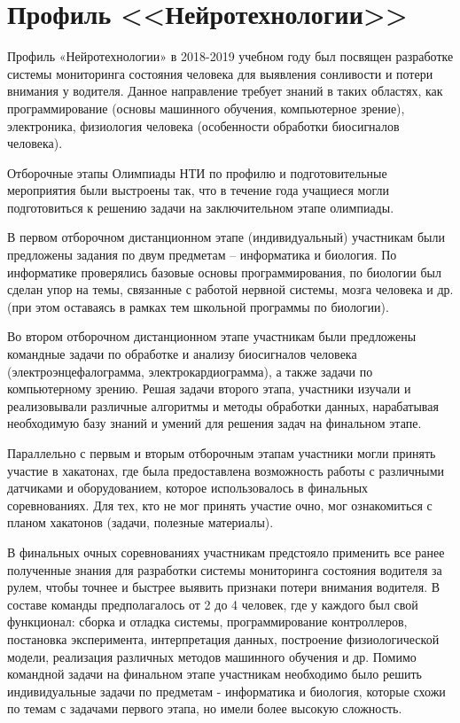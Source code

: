 

\chapter{Профиль <<Нейротехнологии>>}

Профиль «Нейротехнологии» в 2018-2019 учебном году был посвящен разработке системы мониторинга состояния человека для выявления сонливости и потери внимания у водителя. Данное направление требует знаний в таких областях, как программирование (основы машинного обучения, компьютерное зрение), электроника, физиология человека (особенности обработки биосигналов человека).

Отборочные этапы Олимпиады НТИ по профилю и подготовительные мероприятия были выстроены так, что в течение года учащиеся могли  подготовиться к решению задачи на заключительном этапе олимпиады.

В первом отборочном дистанционном этапе (индивидуальный) участникам были предложены задания по двум предметам – информатика и биология. По информатике проверялись базовые основы программирования, по биологии был сделан упор на темы, связанные с работой нервной системы, мозга человека и др. (при этом оставаясь в рамках тем школьной программы по биологии).

Во втором отборочном дистанционном этапе участникам были предложены командные задачи по обработке и анализу биосигналов человека (электроэнцефалограмма, электрокардиограмма), а также задачи по компьютерному зрению. Решая задачи второго этапа, участники изучали и реализовывали различные алгоритмы и методы обработки данных, нарабатывая необходимую базу знаний и умений для решения задач на финальном этапе.

Параллельно с первым и вторым отборочным этапам участники могли принять участие в хакатонах, где была предоставлена возможность работы с различными датчиками и оборудованием, которое использовалось в финальных соревнованиях. Для тех, кто не мог принять участие очно, мог ознакомиться с планом хакатонов (задачи, полезные материалы).

В финальных очных соревнованиях участникам предстояло применить все ранее полученные знания для разработки системы мониторинга состояния водителя за рулем, чтобы точнее и быстрее выявить признаки потери внимания водителя. В составе команды предполагалось от 2 до 4 человек, где у каждого был свой функционал: сборка и отладка системы, программирование контроллеров, постановка эксперимента, интерпретация данных, построение физиологической модели, реализация различных методов машинного обучения и др.  Помимо командной задачи на финальном этапе участникам необходимо было решить индивидуальные задачи по предметам - информатика и биология, которые схожи по темам с задачами первого этапа, но имели более высокую сложность.
